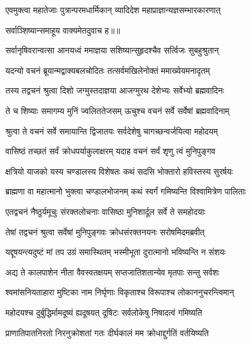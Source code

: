\twolineshloka
{एवमुक्त्वा महातेजाः पुत्रान्परमधार्मिकान्}
{व्यादिदेश महाप्राज्ञान्यज्ञसम्भारकारणात्} %

{सर्वाञ्शिष्यान्समाहूय वाक्यमेतदुवाच ह॥॥} %

\addtocounter{shlokacount}{1}

\twolineshloka
{सर्वानृषिवरान्वत्सा आनयध्वं ममाज्ञया}
{सशिष्यान्सुहृदश्चैव सर्त्विजः सुबहुश्रुतान्} %

\twolineshloka
{यदन्यो वचनं ब्रूयान्मद्वाक्यबलचोदितः}
{तत्सर्वमखिलेनोक्तं ममाख्येयमनादृतम्} %

\twolineshloka
{तस्य तद्वचनं श्रुत्वा दिशो जग्मुस्तदाज्ञया}
{आजग्मुरथ देशेभ्यः सर्वेभ्यो ब्रह्मवादिनः} %

\twolineshloka
{ते च शिष्याः समागम्य मुनिं ज्वलिततेजसम्}
{ऊचुश्च वचनं सर्वे सर्वेषां ब्रह्मवादिनाम्} %

\twolineshloka
{श्रुत्वा ते वचनं सर्वे समायान्ति द्विजातयः}
{सर्वदेशेषु चागच्छन्वर्जयित्वा महोदयम्} %

\twolineshloka
{वासिष्ठं तच्छतं सर्वं क्रोधपर्याकुलाक्षरम्}
{यदाह वचनं सर्वं शृणु त्वं मुनिपुङ्गव} %

\twolineshloka
{क्षत्रियो याजको यस्य चण्डालस्य विशेषतः}
{कथं सदसि भोक्तारो हविस्तस्य सुरर्षयः} %

\twolineshloka
{ब्राह्मणा वा महात्मानो भुक्त्वा चण्डालभोजनम्}
{कथं स्वर्गं गमिष्यन्ति विश्वामित्रेण पालिताः} %

\twolineshloka
{एतद्वचनं नैष्ठुर्यमूचुः संरक्तलोचनाः}
{वासिष्ठा मुनिशार्दूल सर्वे ते समहोदयाः} %

\twolineshloka
{तेषां तद्वचनं श्रुत्वा सर्वेषां मुनिपुङ्गवः}
{क्रोधसंरक्तनयनः सरोषमिदमब्रवीत्} %

\twolineshloka
{यद्दूषयन्त्यदुष्टं मां तप उग्रं समास्थितम्}
{भस्मीभूता दुरात्मानो भविष्यन्ति न संशयः} %

\twolineshloka
{अद्य ते कालपाशेन नीता वैवस्वतक्षयम्}
{सप्तजातिशतान्येव मृतपाः सन्तु सर्वशः} %

\twolineshloka
{श्वमांसनियताहारा मुष्टिका नाम निर्घृणाः}
{विकृताश्च विरूपाश्च लोकाननुचरन्त्विमान्} %

\twolineshloka
{महोदयश्च दुर्बुद्धिर्मामदूष्यं ह्यदूषयत्}
{दूषिटः सर्वलोकेषु निषादत्वं गमिष्यति} %

\twolineshloka
{प्राणातिपातनिरतो निरनुक्रोशतां गतः}
{दीर्घकालं मम क्रोधाद्दुर्गतिं वर्तयिष्यति} %


